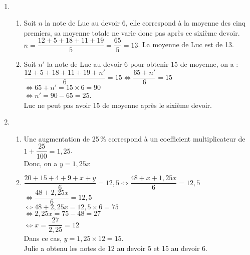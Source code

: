\ \\ [-5mm]
   \begin{enumerate}
      \item
         \begin{enumerate}
            \item Soit $n$ la note de Luc au devoir 6, elle correspond à la moyenne des cinq premiers, sa moyenne totale ne varie donc pas après ce sixième devoir. \\ [1mm]
               $n =\dfrac{12+5+18+11+19}{5} =\dfrac{65}{5} =13$. {\blue La moyenne de Luc est de 13}. \smallskip
            \item Soit $n'$ la note de Luc au devoir 6 pour obtenir 15 de moyenne, on a : \\ [1mm]
               $\dfrac{12+5+18+11+19+n'}{6} =15 \iff \dfrac{65+n'}{6}=15$ \\ [2mm]
               \hspace*{4.6cm} $\iff 65+n' =15\times6 =90$ \\ [1mm]
               \hspace*{4.6cm} $\iff n' =90-65 =25$. \\
               {\blue Luc ne peut pas avoir 15 de moyenne après le sixième devoir.}
         \end{enumerate}
      \setcounter{enumi}{1}
      \item
         \begin{enumerate}
            \item Une augmentation de 25\,\% correspond à un coefficient multiplicateur de $1+\dfrac{25}{100} =1,25$. \\
               Donc, on a {\blue $y=1,25x$} \medskip
            \item $\dfrac{20+15+4+9+x+y}{6} =12,5 \iff \dfrac{48+x+1,25x}{6}=12,5$ \\ [2mm]
               \hspace*{4.95cm} $\iff \dfrac{48+2,25x}{6} =12,5$ \\ [2mm]
               \hspace*{4.95cm} $\iff 48+2,25x =12,5\times6 =75$ \\ [1mm]
               \hspace*{4.95cm} $\iff 2,25x =75-48 =27$ \\ [2mm]
               \hspace*{4.95cm} $ \iff x =\dfrac{27}{2,25} =12$ \\ [1mm]
               Dans ce cas, $y=1,25\times12 =15$. \\
               {\blue Julie a obtenu les notes de 12 au devoir 5 et 15 au devoir 6.}
         \end{enumerate}
   \end{enumerate}
